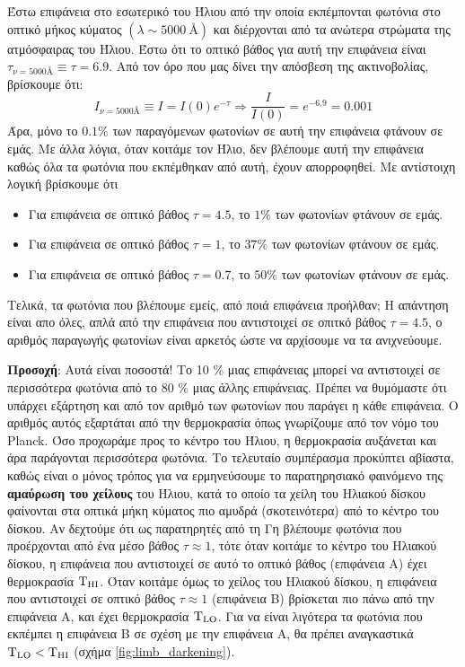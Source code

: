 Έστω επιφάνεια στο εσωτερικό του Ήλιου από την οποία εκπέμπονται φωτόνια στο οπτικό μήκος κύματος $(\lambda \sim 5000 \ \text{\AA})$ και διέρχονται από τα ανώτερα στρώματα της ατμόσφαιρας του Ήλιου. Έστω ότι το οπτικό βάθος για αυτή την επιφάνεια είναι $\tau_{\nu = 5000\text{\AA}} \equiv \tau = 6.9$. 
Από τον όρο που μας δίνει την απόσβεση της ακτινοβολίας, βρίσκουμε ότι:
$$I_{\nu = 5000\text{\AA}} \equiv I = I(0) e^{- \tau} \Rightarrow \frac{I}{I(0)} = e^{-6.9} = 0.001$$
Άρα, μόνο το $0.1 \%$ των παραγόμενων φωτονίων σε αυτή την επιφάνεια φτάνουν σε εμάς. Με άλλα λόγια, όταν κοιτάμε τον Ήλιο, δεν βλέπουμε αυτή την επιφάνεια καθώς όλα τα φωτόνια που εκπέμθηκαν από αυτή, έχουν απορροφηθεί. Με αντίστοιχη λογική βρίσκουμε ότι
\begin{itemize}
    \item Για επιφάνεια σε οπτικό βάθος $\tau = 4.5$, το $1 \%$ των φωτονίων φτάνουν σε εμάς.
    \item Για επιφάνεια σε οπτικό βάθος $\tau = 1$, το $37 \%$ των φωτονίων φτάνουν σε εμάς.
    \item Για επιφάνεια σε οπτικό βάθος $\tau = 0.7$, το $50 \%$ των φωτονίων φτάνουν σε εμάς.
\end{itemize}
Τελικά, τα φωτόνια που βλέπουμε εμείς, από ποιά επιφάνεια προήλθαν; Η απάντηση είναι απο όλες, απλά από την επιφάνεια που αντιστοιχεί σε οπιτκό βάθος $\tau = 4.5$, ο αριθμός παραγωγής φωτονίων είναι αρκετός ώστε να αρχίσουμε να τα ανιχνεύουμε.

\textbf{Προσοχή}: Αυτά είναι ποσοστά! Το 10 \% μιας επιφάνειας μπορεί να αντιστοιχεί σε περισσότερα φωτόνια από το 80 \% μιας άλλης επιφάνειας. Πρέπει να θυμόμαστε ότι υπάρχει εξάρτηση και από τον αριθμό των φωτονίων που παράγει η κάθε επιφάνεια. Ο αριθμός αυτός εξαρτάται από την θερμοκρασία όπως γνωρίζουμε από τον νόμο του Planck. Όσο προχωράμε προς το κέντρο του Ήλιου, η θερμοκρασία αυξάνεται και άρα παράγονται περισσότερα φωτόνια. Το τελευταίο συμπέρασμα προκύπτει αβίαστα, καθώς είναι ο μόνος τρόπος για να ερμηνεύσουμε το παρατηρησιακό φαινόμενο της \textbf{αμαύρωση του χείλους} του Ήλιου, κατά το οποίο τα χείλη του Ηλιακού δίσκου φαίνονται στα οπτικά μήκη κύματος πιο αμυδρά (σκοτεινότερα) από το κέντρο του δίσκου. Αν δεχτούμε ότι ως παρατηρητές από τη Γη βλέπουμε φωτόνια που προέρχονται από ένα μέσο βάθος $\tau \approx 1$, τότε όταν κοιτάμε το κέντρο του Ηλιακού δίσκου, η επιφάνεια που αντιστοιχεί σε αυτό το οπτικό βάθος (επιφάνεια Α) έχει θερμοκρασία $\rm T_{HI}$. Όταν κοιτάμε όμως το χείλος του Ηλιακού δίσκου, η επιφάνεια που αντιστοιχεί σε οπτικό βάθος $\tau \approx 1$ (επιφάνεια Β) βρίσκεται πιο πάνω από την επιφάνεια Α, και έχει θερμοκρασία $\rm T_{LO}$. Για να είναι λιγότερα τα φωτόνια που εκπέμπει η επιφάνεια Β σε σχέση με την επιφάνεια Α, θα πρέπει αναγκαστικά $\rm T_{LO} < T_{HI}$ (σχήμα \ref{fig:limb_darkening}).


